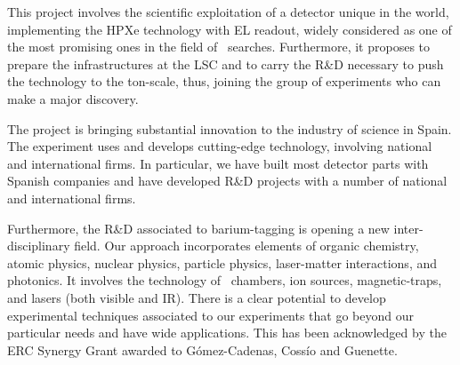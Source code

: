 

This project involves the scientific exploitation of a detector unique in the world, implementing the HPXe technology with EL readout, widely considered as one of the most promising ones in the field of \bbonu\ searches. Furthermore, it proposes to prepare the infrastructures at the LSC and to carry the R\&D necessary to push the technology to the ton-scale, thus, joining the group of experiments who can make a major discovery. 

\indent

The project is bringing substantial innovation to the industry of science in Spain. The experiment uses and develops cutting-edge technology, involving national and international firms. In particular, we have built most detector parts with Spanish companies and have developed R\&D  projects with a number of national and international firms.

\indent

Furthermore, the R\&D associated to barium-tagging is opening a new inter-disciplinary field. Our approach incorporates elements of organic chemistry, atomic physics, nuclear physics, particle physics, laser-matter interactions, and photonics. It involves the technology of \HPXeEL\ chambers, ion sources, magnetic-traps, and lasers (both visible and IR). There is a clear potential to develop experimental techniques associated to our experiments that go beyond our particular needs and have wide applications. This has been acknowledged by the ERC Synergy Grant awarded to G\'omez-Cadenas, Coss\'io and Guenette. 
